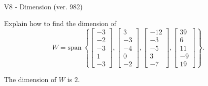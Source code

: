 \begin{exercise}
  \begin{exerciseTitle}V8 - Dimension (ver. 982)\end{exerciseTitle}
  \begin{exerciseStatement}
    Explain how to find the dimension of 
\[W=\mathrm{span}\ \left\{\left[\begin{array}{r}
-3 \\
-2 \\
-3 \\
1 \\
-3
\end{array}\right] , \left[\begin{array}{r}
3 \\
-3 \\
-4 \\
0 \\
-2
\end{array}\right] , \left[\begin{array}{r}
-12 \\
-3 \\
-5 \\
3 \\
-7
\end{array}\right] , \left[\begin{array}{r}
39 \\
6 \\
11 \\
-9 \\
19
\end{array}\right]\right\}.\]



  \end{exerciseStatement}
  \begin{exerciseAnswer}
   The dimension of \(W\) is  \(2\).
  


  \end{exerciseAnswer}
\end{exercise}